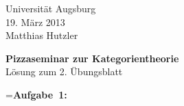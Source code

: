 \documentclass[a4paper,ngerman]{scrartcl}
\theoremstyle{definition}
\theoremstyle{plain}
\theoremstyle{remark}
\begin{document}
\vspace*{-4em}
\begin{flushright}Universität Augsburg \\ 19. März 2013 \\ Matthias Hutzler\end{flushright}

\begin{center}\Large \textbf{Pizzaseminar zur Kategorientheorie} \\
Lösung zum 2. Übungsblatt
\end{center}
\vspace{2em}

\newbox{\mybox}
\setbox\mybox=\hbox{\textbf{Aufgabe 1:}}

\end{document}
